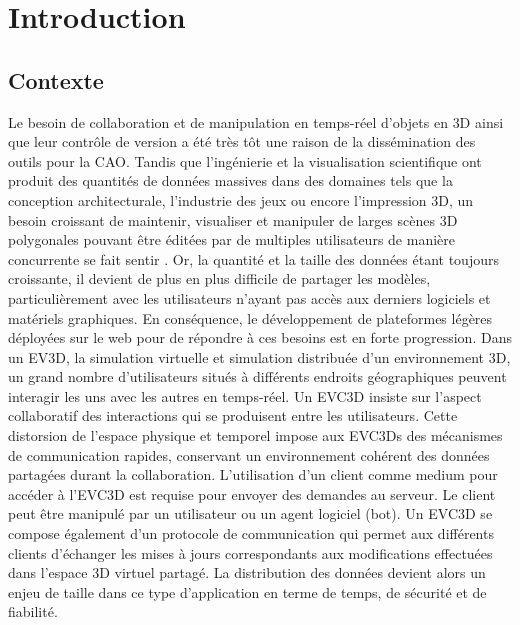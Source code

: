 \chapter{Introduction}
\chaptertable
\section{Contexte}
Le besoin de collaboration et de manipulation en temps-réel d'objets en \gls{3D} 
ainsi que leur contrôle de version a été très tôt une raison de la dissémination des 
outils pour la \gls{CAO}. Tandis que l'ingénierie et la visualisation scientifique ont 
produit des quantités de données massives dans des domaines tels que la 
conception architecturale, l'industrie des jeux ou encore l'impression \gls{3D}, un 
besoin croissant de maintenir, visualiser et manipuler de larges scènes \gls{3D} 
polygonales pouvant être éditées par de multiples utilisateurs de manière 
concurrente se fait sentir \cite{Chandrasegaran2013,Wu2014}. Or, la quantité et la taille des données 
étant toujours croissante, il devient de plus en plus difficile de partager les 
modèles, particulièrement avec les utilisateurs n'ayant pas accès aux derniers 
logiciels et matériels graphiques. En conséquence,
le développement de plateformes légères déployées sur le web pour de répondre à ces 
besoins est en forte progression. 
Dans un \gls{EV3D}, la simulation virtuelle et simulation distribuée d'un environnement 3D, un grand nombre d'utilisateurs situés à différents endroits géographiques peuvent 
interagir les uns avec les autres en temps-réel. Un \gls{EVC3D} insiste sur l'aspect collaboratif des interactions qui se produisent entre les utilisateurs.
Cette distorsion de l'espace physique et temporel impose aux \glspl{EVC3D} des 
mécanismes de communication rapides, conservant un environnement cohérent
des données partagées durant la collaboration. 
L'utilisation d'un client comme medium pour 
accéder à l'\gls{EVC3D} est requise pour envoyer des demandes au serveur. Le 
client peut être manipulé par un utilisateur ou un agent logiciel (bot).
Un \gls{EVC3D} se compose également d'un protocole de communication qui 
permet aux différents clients d'échanger les mises à jours correspondants aux 
modifications effectuées dans l'espace 3D virtuel partagé. La distribution des 
données devient alors un enjeu de taille dans ce type d'application en terme de 
temps, de sécurité et de fiabilité. 





